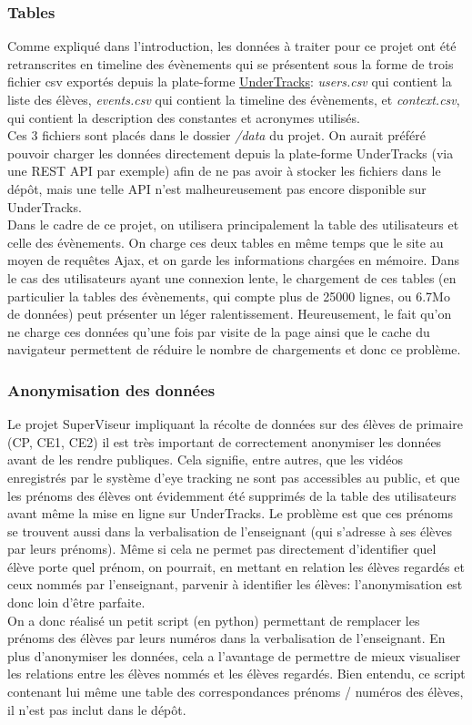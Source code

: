\documentclass{article}
\begin{document}
\subsubsection{Tables}
Comme expliqué dans l'introduction, les données à traiter pour ce projet ont été retranscrites en timeline des évènements qui se présentent sous la forme de trois fichier csv exportés depuis la plate-forme \href{https://undertracks.imag.fr/}{UnderTracks}: \textit{users.csv} qui contient la liste des élèves, \textit{events.csv} qui contient la timeline des évènements, et \textit{context.csv}, qui contient la description des constantes et acronymes utilisés.\\
Ces 3 fichiers sont placés dans le dossier \textit{/data} du projet. On aurait préféré pouvoir charger les données directement depuis la plate-forme UnderTracks (via une REST API par exemple) afin de ne pas avoir à stocker les fichiers dans le dépôt, mais une telle API n'est malheureusement pas encore disponible sur UnderTracks.\\
Dans le cadre de ce projet, on utilisera principalement la table des utilisateurs et celle des évènements. On charge ces deux tables en même temps que le site au moyen de requêtes Ajax, et on garde les informations chargées en mémoire. Dans le cas des utilisateurs ayant une connexion lente, le chargement de ces tables (en particulier la tables des évènements, qui compte plus de 25000 lignes, ou 6.7Mo de données) peut présenter un léger ralentissement. Heureusement, le fait qu'on ne charge ces données qu'une fois par visite de la page ainsi que le cache du navigateur permettent de réduire le nombre de chargements et donc ce problème.

\subsubsection{Anonymisation des données}
Le projet SuperViseur impliquant la récolte de données sur des élèves de primaire (CP, CE1, CE2) il est très important de correctement anonymiser les données avant de les rendre publiques. Cela signifie, entre autres, que les vidéos enregistrés par le système d'eye tracking ne sont pas accessibles au public, et que les prénoms des élèves ont évidemment été supprimés de la table des utilisateurs avant même la mise en ligne sur UnderTracks. Le problème est que ces prénoms se trouvent aussi dans la verbalisation de l'enseignant (qui s'adresse à ses élèves par leurs prénoms). Même si cela ne permet pas directement d'identifier quel élève porte quel prénom, on pourrait, en mettant en relation les élèves regardés et ceux nommés par l'enseignant, parvenir à identifier les élèves: l'anonymisation est donc loin d'être parfaite.\\
On a donc réalisé un petit script (en python) permettant de remplacer les prénoms des élèves par leurs numéros dans la verbalisation de l'enseignant. En plus d'anonymiser les données, cela a l'avantage de permettre de mieux visualiser les relations entre les élèves nommés et les élèves regardés. Bien entendu, ce script contenant lui même une table des correspondances prénoms / numéros des élèves, il n'est pas inclut dans le dépôt.
\end{document}
